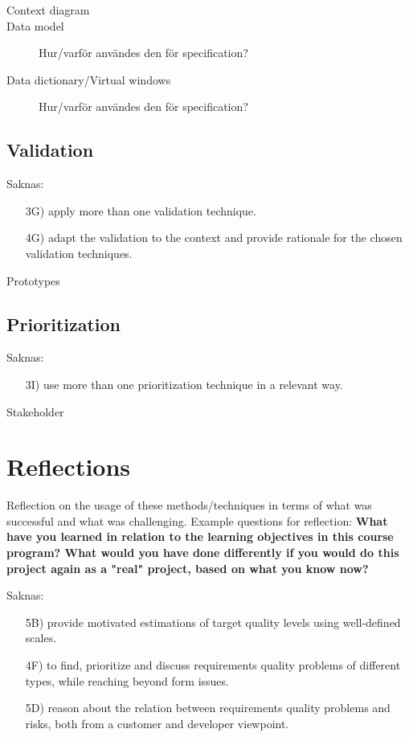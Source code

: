 \documentclass[10pt,a4paper]{article}
\begin{document}
\begin{description}
\item[Context diagram] 
\item[Data model] Hur/varför användes den för specification?
\item[Data dictionary/Virtual windows] Hur/varför användes den för specification?
\end{description}

\subsection{Validation}
{\Large Saknas:}
\begin{itemize}
\item[3G)] apply more than one validation technique.
\item[4G)] adapt the validation to the context and provide rationale for the chosen validation techniques.
\end{itemize}

\begin{description}
\item[Prototypes]
\end{description}

\subsection{Prioritization}
{\Large Saknas:}
\begin{itemize}
\item[3I)] use more than one prioritization technique in a relevant way.
\end{itemize}

\begin{description}
\item[Stakeholder]
\end{description}

\section{Reflections}
Reflection on the usage of these methods/techniques in terms of what was successful and what was challenging. Example questions for reflection: \textbf{What have you learned in relation to the learning objectives in this course program? What would you have done differently if you would do this project again as a "real" project, based on what you know now?}

{\Large Saknas:}
\begin{itemize}
\item[5B)] provide motivated estimations of target quality levels using well-defined scales.
\item[4F)] to find, prioritize and discuss requirements quality problems of different types, while reaching 	beyond form issues.
\item[5D)] reason about the relation between requirements quality problems and risks, both from a customer and developer viewpoint.
\end{itemize}
\end{document}
